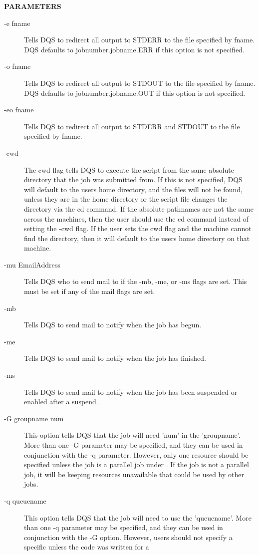 {\bf PARAMETERS}
\begin{description}
\item[-e fname] Tells DQS to redirect all output to STDERR to
the file specified by fname.  DQS defaults to jobnumber.jobname.ERR if
this option is not specified.
\item[-o fname] Tells DQS to redirect all output to STDOUT to
the file specified by fname.  DQS defaults to jobnumber.jobname.OUT if this
option is not specified.
\item[-eo fname] Tells DQS to redirect all output to STDERR and
STDOUT to the file specified by fname.
\item[-cwd] The cwd flag tells DQS to execute the script from the same
absolute directory that the job was submitted from.  If this is not
specified, DQS will default to the users home directory, and the files
will not be found, unless they are in the home directory or the script
file changes the directory via the cd command.  If the absolute pathnames
are not the same across the machines, then the user should use the cd
command instead of setting the -cwd flag.  If the user sets the cwd flag
and the machine cannot find the directory, then it will default to the
users home directory on that machine.
\item[-mu EmailAddress] Tells DQS who to send mail to if the -mb,
-me, or -ms flags are set.  This must be set if any of the mail flags
are set.
\item[-mb] Tells DQS to send mail to notify when the job has begun.
\item[-me] Tells DQS to send mail to notify when the job has finished.
\item[-ms] Tells DQS to send mail to notify when the job has been suspended
or enabled after a suspend.
\item[-G groupname num] This option tells DQS that the job
will need 'num' \queues in the \group 'groupname'.  More than one -G
parameter may be specified, and they can be used in conjunction with
the -q parameter.  However, only one resource should be specified
unless the job is a parallel job under \pvm.  If the job is not a
parallel job, it will be keeping resources unavailable that could be
used by other jobs.
\item[-q queuename] This option tells DQS that the job will need to use the
\queue 'queuename'.  More than one -q parameter may be specified, and
they can be used in conjunction with the -G option.  However, users
should not specify a specific \queue unless the code was written for a

\end{description}
